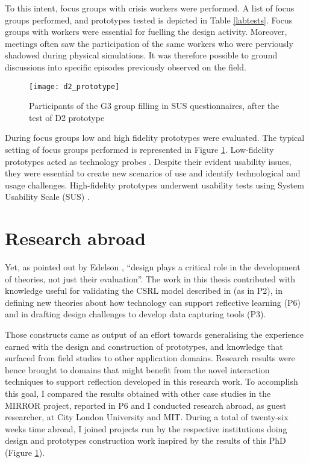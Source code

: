 To this intent, focus groups with crisis workers were performed. A list of focus groups performed, and prototypes tested is depicted in Table \ref{labtests}. Focus groups with workers were essential for fuelling the design activity. Moreover, meetings often saw the participation of the same workers who were perviously shadowed during physical simulations. It was therefore possible to ground discussions into specific episodes previously observed on the field.

\begin{figure}
	[tbh] \centering 
	\texttt{[image: d2\_prototype]} \caption{Participants of the G3 group filling in SUS questionnaires, after the test of D2 prototype} \label{fig:focus-group} 
\end{figure}

During focus groups low and high fidelity prototypes were evaluated. The typical setting of focus groups performed is represented in Figure \ref{fig:focus-group}. Low-fidelity prototypes acted as technology probes \autocite{Hutchinson:2003il}. Despite their evident usability issues, they were essential to create new scenarios of use and identify technological and usage challenges. High-fidelity prototypes underwent usability tests \autocite{Dumas:2009th} using System Usability Scale (SUS) \autocite[ pag.189]{jordan1996usability}.

\section{Research abroad}\label{research-abroad}

Yet, as pointed out by Edelson \autocite*{Edelson:2002kp}, ``design plays a critical role in the development of theories, not just their evaluation''. The work in this thesis contributed with knowledge useful for validating the CSRL model described in \autocite{Krogstie:2013kf} (as in P2), in defining new theories about how technology can support reflective learning (P6) and in drafting design challenges to develop data capturing tools (P3).

Those constructs came as output of an effort towards generalising the experience earned with the design and construction of prototypes, and knowledge that surfaced from field studies to other application domains. Research results were hence brought to domains that might benefit from the novel interaction techniques to support reflection developed in this research work. To accomplish this goal, I compared the results obtained with other case studies in the MIRROR project, reported in P6 and I conducted research abroad, as guest researcher, at City London University and MIT. During a total of twenty-six weeks time abroad, I joined projects run by the respective institutions doing design and prototypes construction work inspired by the results of this PhD (Figure \ref{research-abroad}).

